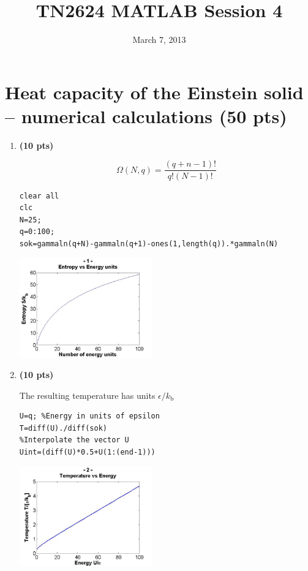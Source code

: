 \documentclass[11pt]{article}
\begin{document}
\title{TN2624 MATLAB Session 4}
\date{March 7, 2013}
\maketitle


\section*{Heat capacity of the Einstein solid  -- numerical calculations (50 pts)}
\label{sec:lot}


\begin{enumerate}[resume]
\item \textbf{(10 pts)} 

$$
\Omega(N,q)=\frac{(q+n-1)!}{q!(N-1)!}
$$


\begin{verbatim}
clear all
clc
N=25;
q=0:100;
sok=gammaln(q+N)-gammaln(q+1)-ones(1,length(q)).*gammaln(N)
\end{verbatim}

\includegraphics[width=0.45\textwidth]{P1.jpg}


\item \textbf{(10 pts)} 

The resulting temperature has units $\epsilon/k_\mathrm{b}$

\begin{verbatim}
U=q; %Energy in units of epsilon
T=diff(U)./diff(sok)
%Interpolate the vector U
Uint=(diff(U)*0.5+U(1:(end-1)))
\end{verbatim}

\includegraphics[width=0.45\textwidth]{P2.jpg}


\end{enumerate}
\end{document}
